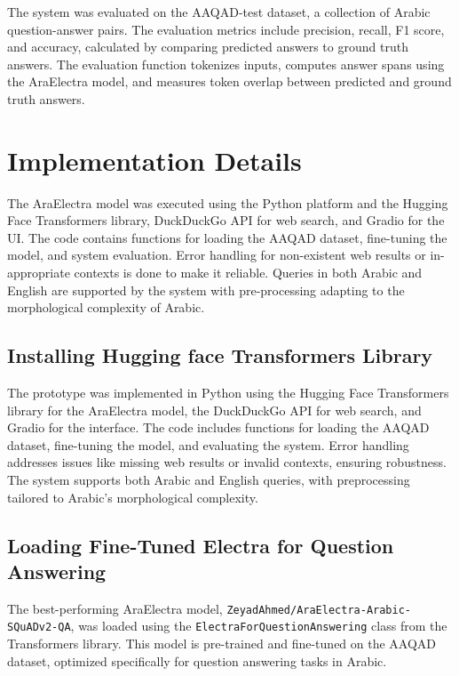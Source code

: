 \documentclass[conference]{IEEEtran}
\begin{document}
The system was evaluated on the AAQAD-test dataset, a collection of Arabic question-answer pairs. The evaluation metrics include precision, recall, F1 score, and accuracy, calculated by comparing predicted answers to ground truth answers. The evaluation function tokenizes inputs, computes answer spans using the AraElectra model, and measures token overlap between predicted and ground truth answers.

\section{Implementation Details}
The AraElectra model was executed using the Python platform and the Hugging Face Transformers library, DuckDuckGo API for web search, and Gradio for the UI. The code contains functions for loading the AAQAD dataset, fine-tuning the model, and system evaluation. Error handling for non-existent web results or in-appropriate contexts is done to make it reliable. Queries in both Arabic and English are supported by the system with pre-processing adapting to the morphological complexity of Arabic.

\subsection{Installing Hugging face Transformers Library}
The prototype was implemented in Python using the Hugging Face Transformers library for the AraElectra model, the DuckDuckGo API for web search, and Gradio for the interface. The code includes functions for loading the AAQAD dataset, fine-tuning the model, and evaluating the system. Error handling addresses issues like missing web results or invalid contexts, ensuring robustness. The system supports both Arabic and English queries, with preprocessing tailored to Arabic’s morphological complexity.

\subsection{Loading Fine-Tuned Electra for Question Answering}

The best-performing AraElectra model, \texttt{ZeyadAhmed/AraElectra-Arabic-SQuADv2-QA},
was loaded using the \texttt{ElectraForQuestionAnswering} class from the Transformers library. This model is pre-trained and fine-tuned on the AAQAD dataset, optimized specifically for question answering tasks in Arabic.
\end{document}
